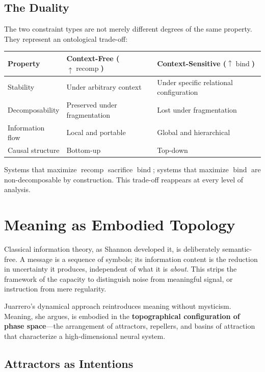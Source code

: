 \documentclass[11pt]{article}
\newcommand{\bind}{\operatorname{bind}}
\newcommand{\recomp}{\operatorname{recomp}}
\begin{document}
\subsection{The Duality}

The two constraint types are not merely different degrees of the same property. They
represent an ontological trade-off:

\begin{center}
\begin{tabular}{@{}lll@{}}
\toprule
\textbf{Property} & \textbf{Context-Free ($\uparrow\recomp$)} & \textbf{Context-Sensitive ($\uparrow\bind$)} \\
\midrule
Stability & Under arbitrary context & Under specific relational configuration \\
Decomposability & Preserved under fragmentation & Lost under fragmentation \\
Information flow & Local and portable & Global and hierarchical \\
Causal structure & Bottom-up & Top-down \\
\bottomrule
\end{tabular}
\end{center}

\noindent
Systems that maximize $\recomp$ sacrifice $\bind$; systems that maximize $\bind$ are
non-decomposable by construction. This trade-off reappears at every level of analysis.

\section{Meaning as Embodied Topology}

Classical information theory, as Shannon developed it, is deliberately semantic-free. A
message is a sequence of symbols; its information content is the reduction in uncertainty
it produces, independent of what it is \emph{about}. This strips the framework of the
capacity to distinguish noise from meaningful signal, or instruction from mere regularity.

Juarrero's dynamical approach reintroduces meaning without mysticism. Meaning, she argues,
is embodied in the \textbf{topographical configuration of phase space}—the arrangement of
attractors, repellers, and basins of attraction that characterize a high-dimensional neural
system.

\subsection{Attractors as Intentions}
\end{document}
